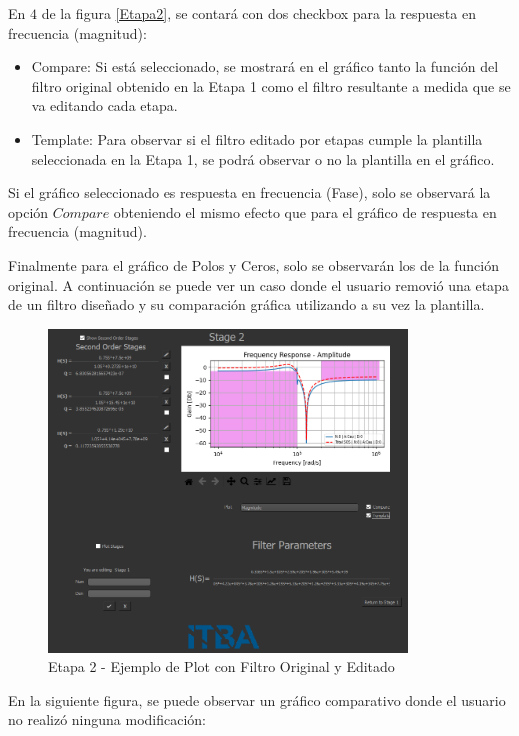 En $4$ de la figura \ref{Etapa2}, se contará con dos checkbox para la respuesta en frecuencia (magnitud):

\begin{itemize}
	\item Compare: Si está seleccionado, se mostrará en el gráfico tanto la función del filtro original obtenido en la Etapa 1 como el filtro resultante a medida que se va editando cada etapa.
	\item Template: Para observar si el filtro editado por etapas cumple la plantilla seleccionada en la Etapa 1, se podrá observar o no la plantilla en el gráfico.
\end{itemize}

Si el gráfico seleccionado es respuesta en frecuencia (Fase), solo se observará la opción $Compare$ obteniendo el mismo efecto que para el gráfico de respuesta en frecuencia (magnitud).

Finalmente para el gráfico de Polos y Ceros, solo se observarán los de la función original. A continuación se puede ver un caso donde el usuario removió una etapa de un filtro diseñado y su comparación gráfica utilizando a su vez la plantilla.

\begin{figure}[H]
    \centering
    \includegraphics[width=0.85\textwidth]{../Ejercicio1-FilterTool/Imagenes/comparame-com-plantilla.png}
    \caption{Etapa 2 - Ejemplo de Plot con Filtro Original y Editado}
\end{figure}

En la siguiente figura, se puede observar un gráfico comparativo donde el usuario no realizó ninguna modificación:

